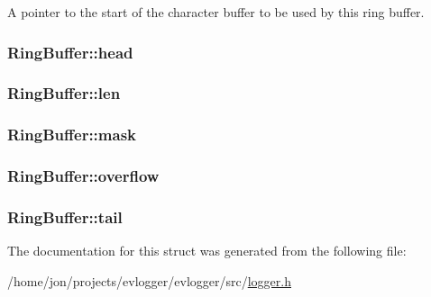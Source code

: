 \-A pointer to the start of the character buffer to be used by this ring buffer. 

\hypertarget{structRingBuffer_a8c9823e492bfbf2cbeac47842a016064}{
\subsubsection[{head}]{ {\bf \-Ring\-Buffer\-::head}}}\label{structRingBuffer_a8c9823e492bfbf2cbeac47842a016064}
\hypertarget{structRingBuffer_a923fbf140b33a972b4a9ee600d3b2c8f}{
\subsubsection[{len}]{ {\bf \-Ring\-Buffer\-::len}}}\label{structRingBuffer_a923fbf140b33a972b4a9ee600d3b2c8f}
\hypertarget{structRingBuffer_a1a2bdd08c426bd4721d7c3d6f68c93d6}{
\subsubsection[{mask}]{ {\bf \-Ring\-Buffer\-::mask}}}\label{structRingBuffer_a1a2bdd08c426bd4721d7c3d6f68c93d6}
\hypertarget{structRingBuffer_a2477690ded4ea57e830d91c05bf5ae70}{
\subsubsection[{overflow}]{ {\bf \-Ring\-Buffer\-::overflow}}}\label{structRingBuffer_a2477690ded4ea57e830d91c05bf5ae70}
\hypertarget{structRingBuffer_aa2c8753c26e7a2641f6ee9f4464455e8}{
\subsubsection[{tail}]{ {\bf \-Ring\-Buffer\-::tail}}}\label{structRingBuffer_aa2c8753c26e7a2641f6ee9f4464455e8}


\-The documentation for this struct was generated from the following file\-:\begin{DoxyCompactItemize}
\item 
/home/jon/projects/evlogger/evlogger/src/\hyperlink{logger_8h}{logger.\-h}\end{DoxyCompactItemize}
